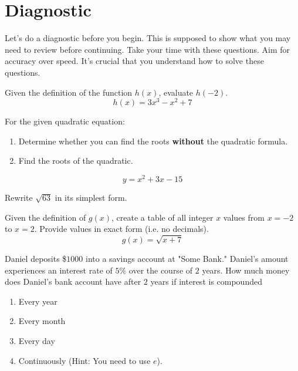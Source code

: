 \chapter*{Diagnostic}
Let's do a diagnostic before you begin. This is supposed to show what you may need to review before continuing. Take your time with these questions. Aim for accuracy over speed. It's crucial that you understand how to solve these questions.

\begin{problem}[title=Problem 1]
    Given the definition of the function $h(x)$, evaluate $h(-2)$.
    \[
        h(x) = 3x^3 - x^2 + 7
    \]
\end{problem}

\begin{problem}[title=Problem 2]
    For the given quadratic equation:
    \begin{enumerate}
        \item Determine whether you can find the roots \textbf{without} the quadratic formula.
        \item Find the roots of the quadratic.
    \end{enumerate}
    \[
        y = x^2 + 3x - 15
    \]
\end{problem}

\begin{problem}[title=Problem 3]
    Rewrite $\sqrt{63}$ in its simplest form.
\end{problem}

\begin{problem}[title=Problem 4]
    Given the definition of $g(x)$, create a table of all integer $x$ values from $x = -2$ to $x = 2$. Provide values in exact form (i.e. no decimals).
    \[
        g(x) = \sqrt{x + 7}
    \]
\end{problem}

\begin{problem}[title=Problem 5]
    Daniel deposits \$$1000$ into a savings account at "Some Bank." Daniel's amount experiences an interest rate of $5\%$ over the course of $2$ years. How much money does Daniel's bank account have after $2$ years if interest is compounded
    \begin{enumerate}
        \item Every year
        \item Every month
        \item Every day
        \item Continuously (Hint: You need to use $e$).
    \end{enumerate}
\end{problem}

